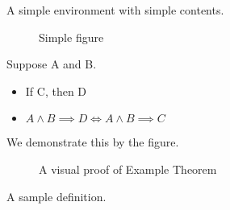\documentclass{minimal}
\begin{document}
\begin{defn}[Definition 1]
  \label{defn:definition_1}
  A simple environment with simple contents.
\end{defn}

\begin{figure}[ht] %
  \centering
  \caption{Simple figure}
  \label{fig:simple_figure}
\end{figure}

\begin{thm}
  \label{thm:example_title_of_theorem}
  Suppose A and B.

  \begin{itemize}
    \item If C, then D
    \item \(A \wedge B \implies D \iff A \wedge B \implies C\)
  \end{itemize}

  We demonstrate this by the figure.

  \begin{figure}[ht] %
    \centering
    \caption{A visual proof of Example Theorem}
    \label{fig:visual_theorem}
  \end{figure}
\end{thm}

\begin{defn}[Definition 2]
  \label{defn:definition_2}
  A sample definition.

  \caption{A caption for an environment typically without caption}
\end{defn}
\end{document}
